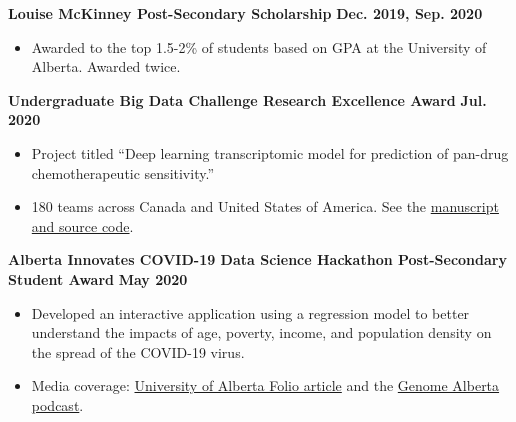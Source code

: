 \documentclass{article}
\begin{document}
\textbf{Louise McKinney Post-Secondary Scholarship} \hfill \textbf{Dec. 2019, Sep. 2020}
\begin{itemize}
    \item Awarded to the top 1.5-2\% of students based on GPA at the University of Alberta. Awarded twice.
\end{itemize}

\textbf{Undergraduate Big Data Challenge Research Excellence Award} \hfill \textbf{Jul. 2020}
\begin{itemize}
    \item Project titled ``Deep learning transcriptomic model for prediction of pan-drug chemotherapeutic sensitivity.''
    \item 180 teams across Canada and United States of America. See the \href{https://github.com/tig3r66/youreka_genes}{manuscript and source code}.
\end{itemize}

\textbf{Alberta Innovates COVID-19 Data Science Hackathon Post-Secondary Student Award} \hfill \textbf{May 2020}
\begin{itemize}
    \item Developed an interactive application using a regression model to better understand the impacts of age, poverty, income, and population density on the spread of the COVID-19 virus.
    \item Media coverage: \href{https://www.folio.ca/students-develop-online-tool-to-predict-covid-19-spread-based-on-demographics/}{University of Alberta Folio article} and the \href{https://genomealberta.ca/genomics/genomics_blog_08182001.aspx}{Genome Alberta podcast}.
\end{itemize}


\end{document}
